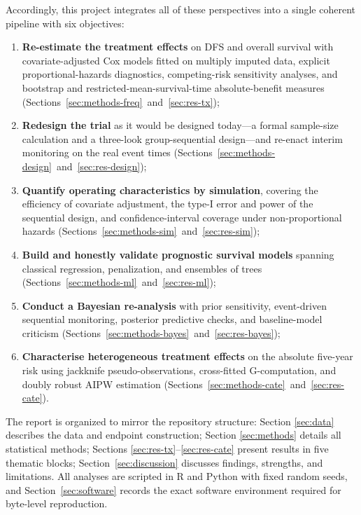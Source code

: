 Accordingly, this project integrates all of these perspectives into a
single coherent pipeline with six objectives:

\begin{enumerate}[leftmargin=1.7em, itemsep=1.5pt, topsep=3pt]
  \item \textbf{Re-estimate the treatment effects} on DFS and overall
        survival with covariate-adjusted Cox models fitted on multiply
        imputed data, explicit proportional-hazards diagnostics,
        competing-risk sensitivity analyses, and bootstrap and
        restricted-mean-survival-time absolute-benefit measures
        (Sections~\ref{sec:methods-freq}~and~\ref{sec:res-tx});
  \item \textbf{Redesign the trial} as it would be designed today---a
        formal sample-size calculation and a three-look group-sequential
        design---and re-enact interim monitoring on the real event times
        (Sections~\ref{sec:methods-design}~and~\ref{sec:res-design});
  \item \textbf{Quantify operating characteristics by simulation},
        covering the efficiency of covariate adjustment, the type-I error
        and power of the sequential design, and confidence-interval
        coverage under non-proportional hazards
        (Sections~\ref{sec:methods-sim}~and~\ref{sec:res-sim});
  \item \textbf{Build and honestly validate prognostic survival models}
        spanning classical regression, penalization, and ensembles of
        trees (Sections~\ref{sec:methods-ml}~and~\ref{sec:res-ml});
  \item \textbf{Conduct a Bayesian re-analysis} with prior sensitivity,
        event-driven sequential monitoring, posterior predictive checks,
        and baseline-model criticism
        (Sections~\ref{sec:methods-bayes}~and~\ref{sec:res-bayes});
  \item \textbf{Characterise heterogeneous treatment effects} on the
        absolute five-year risk using jackknife pseudo-observations,
        cross-fitted G-computation, and doubly robust AIPW estimation
        (Sections~\ref{sec:methods-cate}~and~\ref{sec:res-cate}).
\end{enumerate}

The report is organized to mirror the repository structure: Section
\ref{sec:data} describes the data and endpoint construction; Section
\ref{sec:methods} details all statistical methods; Sections
\ref{sec:res-tx}--\ref{sec:res-cate} present results in five thematic
blocks; Section~\ref{sec:discussion} discusses findings, strengths, and
limitations. All analyses are scripted in R and Python with fixed random
seeds, and Section~\ref{sec:software} records the exact software
environment required for byte-level reproduction.

